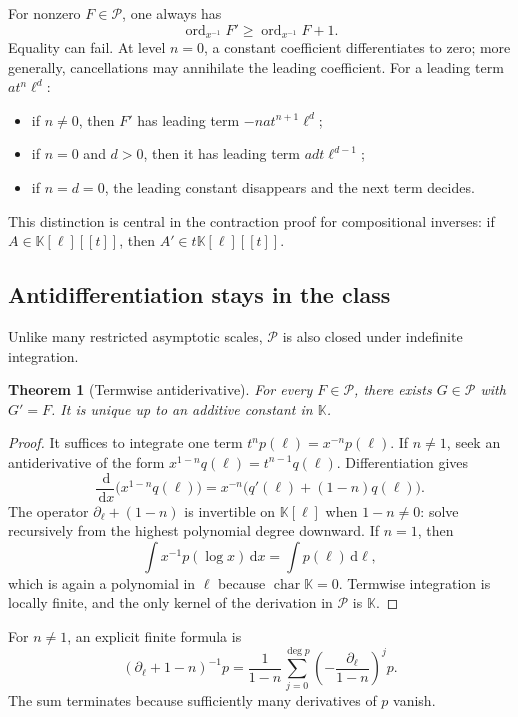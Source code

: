\documentclass[11pt,oneside]{article}
\numberwithin{equation}{section}
\newtheorem{theorem}{Theorem}[section]
\theoremstyle{definition}
\newcommand{\K}{\mathbb K}
\newcommand{\PL}{\mathscr P}
\newcommand{\ordx}{\operatorname{ord}_{x^{-1}}}
\newcommand{\dlog}{\partial_{\ell}}
\newcommand{\dd}{\,\mathrm d}
\begin{document}
For nonzero \(F\in\PL\), one always has
\[
  \ordx F'\ge\ordx F+1.
\]
Equality can fail.  At level \(n=0\), a constant coefficient differentiates to
zero; more generally, cancellations may annihilate the leading coefficient.
For a leading term \(a t^n\ell^d\):
\begin{itemize}
\item if \(n\ne0\), then \(F'\) has leading term
  \(-na t^{n+1}\ell^d\);
\item if \(n=0\) and \(d>0\), then it has leading term
  \(ad t\ell^{d-1}\);
\item if \(n=d=0\), the leading constant disappears and the next term decides.
\end{itemize}
This distinction is central in the contraction proof for compositional inverses:
if \(A\in\K[\ell][[t]]\), then \(A'\in t\K[\ell][[t]]\).

\subsection{Antidifferentiation stays in the class}

Unlike many restricted asymptotic scales, \(\PL\) is also closed under
indefinite integration.

\begin{theorem}[Termwise antiderivative]\label{thm:antiderivative}
For every \(F\in\PL\), there exists \(G\in\PL\) with \(G'=F\).  It is unique up
to an additive constant in \(\K\).
\end{theorem}

\begin{proof}
It suffices to integrate one term \(t^n p(\ell)=x^{-n}p(\ell)\).
If \(n\ne1\), seek an antiderivative of the form
\(x^{1-n}q(\ell)=t^{n-1}q(\ell)\).  Differentiation gives
\[
  \frac{\dd}{\dd x}\bigl(x^{1-n}q(\ell)\bigr)
  =x^{-n}\bigl(q'(\ell)+(1-n)q(\ell)\bigr).
\]
The operator \(\dlog+(1-n)\) is invertible on \(\K[\ell]\) when
\(1-n\ne0\): solve recursively from the highest polynomial degree downward.
If \(n=1\), then
\[
  \int x^{-1}p(\log x)\dd x=\int p(\ell)\dd\ell,
\]
which is again a polynomial in \(\ell\) because \(\operatorname{char}\K=0\).
Termwise integration is locally finite, and the only kernel of the derivation in
\(\PL\) is \(\K\).
\end{proof}

For \(n\ne1\), an explicit finite formula is
\begin{equation}\label{eq:antiderivative-explicit}
  (\dlog+1-n)^{-1}p
  =\frac{1}{1-n}\sum_{j=0}^{\deg p}
    \left(-\frac{\dlog}{1-n}\right)^j p.
\end{equation}
The sum terminates because sufficiently many derivatives of \(p\) vanish.
\end{document}
